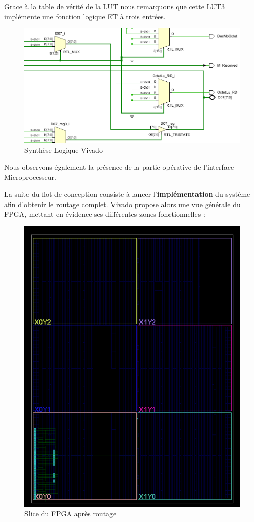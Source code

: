 Grace à la table de vérité de la LUT nous remarquons que cette LUT3 implémente une fonction logique ET à trois entrées.
\newline

\begin{figure}[H]
    \centering
    \includegraphics[width=0.8\linewidth]{images/Routage/Mux_Tris_Vivado.png}
    \caption{Synthèse Logique Vivado}
    \label{fig:rout_general}
\end{figure}

Nous observons également la présence de la partie opérative de l'interface Microprocesseur.
\newline

\medskip

La suite du flot de conception consiste à lancer l’\textbf{implémentation} du système afin d’obtenir le routage complet. 
Vivado propose alors une vue générale du FPGA, mettant en évidence ses différentes zones fonctionnelles :  

\begin{figure}[H]
    \centering
    \includegraphics[width=0.8\linewidth]{images/Routage/Rout_1.png}
    \caption{Slice du FPGA après routage}
    \label{fig:rout_general}
\end{figure}

